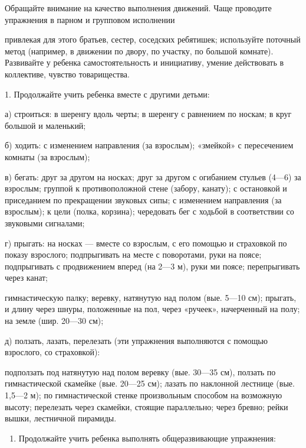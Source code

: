 \documentclass[a5paper]{book}
\begin{document}
Обращайте внимание на качество выполнения движений. Чаще проводите
упражнения в парном и групповом исполнении

привлекая для этого братьев, сестер, соседских ребятишек; используйте
поточный метод (например, в движении по двору, по участку, по большой
комнате). Развивайте у ребенка самостоятельность и инициативу, умение
действовать в коллективе, чувство товарищества.

1. Продолжайте учить ребенка вместе с другими детьми:

а) строиться: в шеренгу вдоль черты; в шеренгу с равнением по носкам; в
круг большой и маленький;

б) ходить: с изменением направления (за взрослым); «змейкой» с
пересечением комнаты (за взрослым);

в) бегать: друг за другом на носках; друг за другом с огибанием стульев
(4---6) за взрослым; группой к противоположной стене (забору, канату); с
остановкой и приседанием по прекращении звуковых сипы; с изменением
направления (за взрослым); к цели (полка, корзина); чередовать бег с
ходьбой в соответствии со звуковыми сигналами;

г) прыгать: на носках --- вместе со взрослым, с его помощью и страховкой
по показу взрослого; подпрыгивать на месте с поворотами, руки на поясе;
подпрыгивать с продвижением вперед (на 2---3 м), руки ми поясе;
перепрыгивать через канат;

гимнастическую палку; веревку, натянутую над полом (вые. 5---10 см);
прыгать, и длину через шнуры, положенные на пол, через «ручеек»,
начерченный на полу; на земле (шир. 20---30 см);

д) ползать, лазать, перелезать (эти упражнения выполняются с помощью
взрослого, со страховкой):

подползать под натянутую над полом веревку (вые. 30---35 см), ползать по
гимнастической скамейке (вые. 20---25 см); лазать по наклонной лестнице
(вые. 1,5---2 м); по гимнастической стенке произвольным способом на
возможную высоту; перелезать через скамейки, стоящие параллельно; через
бревно; рейки вышки, лестничной пирамиды.


\begin{enumerate}
\def\labelenumi{\arabic{enumi}.}
\setcounter{enumi}{2}
\item
  
  Продолжайте учить ребенка выполнять общеразвивающие упражнения:
  
\end{enumerate}
\end{document}
